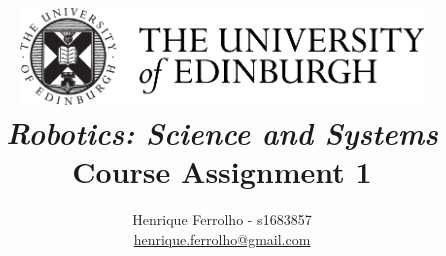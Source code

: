 \title{
    \includegraphics[width=0.8\textwidth]{res/university-of-edinburgh-logo.png}\\
    \bigskip\bigskip
    \bigskip\bigskip
    \bigskip\bigskip
    \huge{\textbf{\textit{Robotics: Science and Systems}}}\\
    \bigskip\bigskip
    \bigskip\bigskip
    \large\textbf{Course Assignment 1}\\
    \bigskip\bigskip
    \bigskip\bigskip
    \bigskip\bigskip
    \bigskip\bigskip
    \bigskip\bigskip
    \bigskip\bigskip
    \bigskip\bigskip
    \bigskip\bigskip
}

\author{
    Henrique Ferrolho - s1683857\\
     \href{mailto:henrique.ferrolho@gmail.com}{henrique.ferrolho@gmail.com}
    \bigskip
}

\maketitle
\thispagestyle{empty}

\newpage

